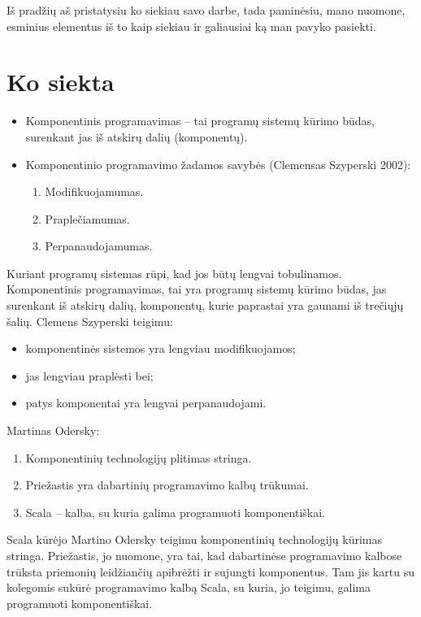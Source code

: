 \begin{handout}
  Iš pradžių aš pristatysiu ko siekiau savo darbe, tada paminėsiu,
  mano nuomone, esminius elementus iš to kaip siekiau ir galiausiai
  ką man pavyko pasiekti.
\end{handout}

\section{Ko siekta}

\begin{frame}
  \begin{itemize}
    \item Komponentinis programavimas – tai programų sistemų kūrimo
      būdas, surenkant jas iš atskirų dalių (komponentų).
    \item Komponentinio programavimo žadamos savybės (Clemensas
      Szyperski 2002):
      \begin{enumerate}
        \item Modifikuojamumas.
        \item Praplečiamumas.
        \item Perpanaudojamumas.
      \end{enumerate}
  \end{itemize}
  \begin{handout}
    Kuriant programų sistemas rūpi, kad jos būtų lengvai tobulinamos.
    Komponentinis programavimas, tai yra programų sistemų kūrimo
    būdas, jas surenkant iš atskirų dalių, komponentų, kurie
    paprastai yra gaunami iš trečiųjų šalių. Clemens Szyperski
    teigimu:
    \begin{itemize}
      \item komponentinės sistemos yra lengviau modifikuojamos;
      \item jas lengviau praplėsti bei;
      \item patys komponentai yra lengvai perpanaudojami.
    \end{itemize}
  \end{handout}
\end{frame}

\begin{frame}
  Martinas Odersky:
  \begin{enumerate}
    \item Komponentinių technologijų plitimas stringa.
    \item Priežastis yra dabartinių programavimo kalbų trūkumai.
    \item Scala – kalba, su kuria galima programuoti komponentiškai.
  \end{enumerate}
  \begin{handout}
    Scala kūrėjo Martino Odersky teigimu komponentinių technologijų
    kūrimas stringa. Priežastis, jo nuomone, yra tai, kad dabartinėse
    programavimo kalbose trūksta priemonių leidžiančių apibrėžti
    ir sujungti komponentus. Tam jis kartu su kolegomis sukūrė
    programavimo kalbą Scala, su kuria, jo teigimu, galima
    programuoti komponentiškai.
  \end{handout}
\end{frame}

